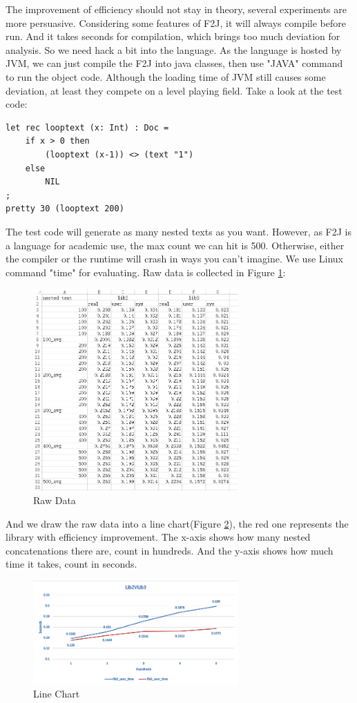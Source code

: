 The improvement of efficiency should not stay in theory, several experiments are more persuasive. Considering some features of F2J, it will always compile before run. And it takes seconds for compilation, which brings too much deviation for analysis. So we need hack a bit into the language. As the language is hosted by JVM, we can just compile the F2J into java classes, then use "JAVA" command to run the object code. Although the loading time of JVM still causes some deviation, at least they compete on a level playing field. Take a look at the test code:
\begin{lstlisting}
let rec looptext (x: Int) : Doc =
    if x > 0 then
        (looptext (x-1)) <> (text "1")
    else
        NIL
;
pretty 30 (looptext 200)
\end{lstlisting}

The test code will generate as many nested texts as you want. However, as F2J is a language for academic use, the max count we can hit is 500. Otherwise, either the compiler or the runtime will crash in ways you can't imagine. We use Linux command "time" for evaluating. Raw data is collected in Figure \ref{fig:efficiency comparation}:
\begin{figure}[h!]
    \centering
    \includegraphics[width=0.7\textwidth]{imgs/raw_data}
    \caption{Raw Data}
    \label{fig:efficiency comparation}
\end{figure}
And we draw the raw data into a line chart(Figure \ref{fig:efficiency line chart}), the red one represents the library with efficiency improvement. The x-axis shows how many nested concatenations there are, count in hundreds. And the y-axis shows how much time it takes, count in seconds.
\begin{figure}[h!]
    \centering
    \includegraphics[width=0.7\textwidth]{imgs/compare}
    \caption{Line Chart}
    \label{fig:efficiency line chart}
\end{figure}

